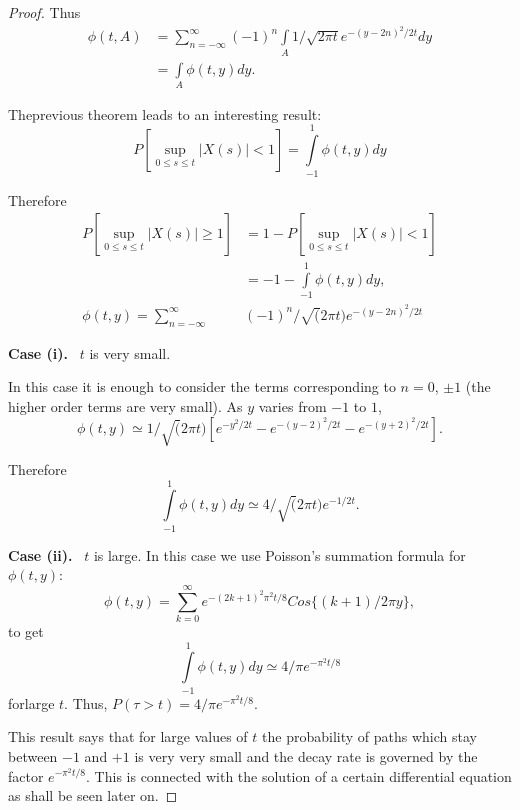 \begin{proof}
Thus
\begin{align*}
\phi(t,A) &=
\sum\limits^{\infty}_{n=-\infty}(-1)^{n}\int\limits_{A} 1/\sqrt{2\pi
  t}e^{-(y-2n)^{2}/2t}dy\\
&= \int\limits_{A}\phi(t,y)dy.
\end{align*}

The\pageoriginale previous theorem leads to an interesting result:
$$
P\left[\sup\limits_{0\leq s\leq
    t}|X(s)|<1\right]=\int\limits^{1}_{-1}\phi(t,y)dy 
$$

Therefore
\begin{align*}
P\left[\sup\limits_{0\leq s\leq t}|X(s)|\geq 1\right] &=
1-P\left[\sup\limits_{0\leq s\leq t}|X(s)|<1\right]\\
&= -1 -\int\limits^{1}_{-1}\phi(t,y)dy,\\
\phi(t,y)=\sum\limits^{\infty}_{n=-\infty}&(-1)^{n}/\surd(2\pi
t)e^{-(y-2n)^{2}/2t} 
\end{align*}

\medskip
\noindent
{\bf Case (i).}~ $t$ is very small.
\smallskip

In this case it is enough to consider the terms corresponding to
$n=0$, $\pm 1$ (the higher order terms are very small). As $y$ varies
from $-1$ to $1$,
$$
\phi(t,y)\simeq 1/\surd(2\pi
t)\left[e^{-y^{2}/2t}-e^{-(y-2)^{2}/2t}-e^{-(y+2)^{2}/2t}\right]. 
$$

Therefore
$$
\int\limits^{1}_{-1}\phi(t,y)dy\simeq 4/\surd(2\pi t)e^{-1/2t}.
$$

\medskip
\noindent
{\bf Case (ii).}~ $t$ is large. In this case we use Poisson's
summation formula for $\phi(t,y)$:
$$
\phi(t,y)=\sum\limits^{\infty}_{k=0}e^{-(2k+1)^{2}\pi^{2}t/8}Cos\{(k+1)/2\pi
y\},
$$
to get
$$
\int\limits^{1}_{-1}\phi(t,y)dy\simeq 4/\pi e^{-\pi^{2}t/8}
$$
for\pageoriginale large $t$. Thus, $P(\tau>t)=4/\pi e^{-\pi^{2}t/8}$.

This result says that for large values of $t$ the probability of paths
which stay between $-1$ and $+1$ is very very small and the decay rate
is governed by the factor $e^{-\pi^{2}t/8}$. This is connected with
the solution of a certain differential equation as shall be seen later
on.
\end{proof}




